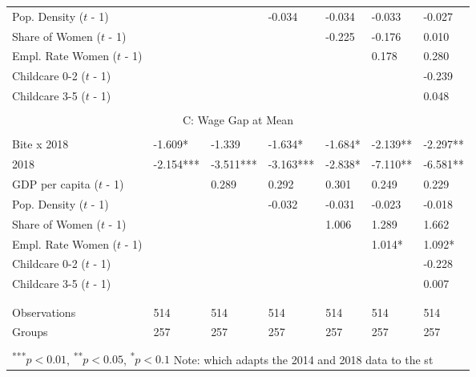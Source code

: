 \documentclass[12pt,draft,a4paper]{article}
\begin{document}
\begin{table}[htbp]
\begin{adjustbox}{width=\textwidth}
\begin{tabular}{l@{\hskip 10ex}llllll}
    Pop. Density ($t$ - 1)     &           &           & -0.034    & -0.034    & -0.033    & -0.027    \\
    Share of Women ($t$ - 1)   &           &           &           & -0.225    & -0.176    & 0.010     \\
    Empl. Rate Women ($t$ - 1) &           &           &           &           & 0.178     & 0.280     \\
    Childcare 0-2 ($t$ - 1)    &           &           &           &           &           & -0.239    \\
    Childcare 3-5 ($t$ - 1)    &           &           &           &           &           & 0.048     \\ 
    \hline & \\[-1.0em]
    \multicolumn{7}{c}{C: Wage Gap at Mean}                                                           \\ 
    \hline & \\[-1.0em]
    Bite x 2018               & -1.609*   & -1.339    & -1.634*   & -1.684*   & -2.139**  & -2.297**  \\
    2018                      & -2.154*** & -3.511*** & -3.163*** & -2.838*   & -7.110**  & -6.581**  \\
    GDP per capita ($t$ - 1)   &           & 0.289     & 0.292     & 0.301     & 0.249     & 0.229     \\
    Pop. Density ($t$ - 1)     &           &           & -0.032    & -0.031    & -0.023    & -0.018    \\
    Share of Women ($t$ - 1)   &           &           &           & 1.006     & 1.289     & 1.662     \\
    Empl. Rate Women ($t$ - 1) &           &           &           &           & 1.014*    & 1.092*    \\
    Childcare 0-2 ($t$ - 1)    &           &           &           &           &           & -0.228    \\
    Childcare 3-5 ($t$ - 1)    &           &           &           &           &           & 0.007     \\ 
    & \\[-1.0em]
    \hline & \\[-1.0em]
    Observations              & 514       & 514       & 514       & 514       & 514       & 514       \\
    Groups                    & 257       & 257       & 257       & 257       & 257       & 257       \\
    \hline & \\[-1.0em]
    \multicolumn{7}{l}{
        \textsuperscript{***}$p < 0.01$, 
        \textsuperscript{**}$p < 0.05$, 
        \textsuperscript{*}$p < 0.1$     
        Note: which adapts the 2014 and 2018 data to the st}
    \end{tabular}
    \end{adjustbox}

    
    \label{tab:main}
    
    \end{table}
\end{document}
